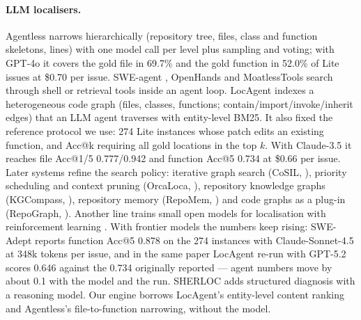 \documentclass[10pt,twocolumn]{article}
\makeatletter
\newcommand{\accat}[1]{Acc@#1}
\makeatother
\begin{document}
\paragraph{LLM localisers.}
Agentless \citep{xia2025agentless} narrows hierarchically (repository tree, files, class and
function skeletons, lines) with one model call per level plus sampling and voting; with GPT-4o it
covers the gold file in 69.7\% and the gold function in 52.0\% of Lite issues at \$0.70 per issue.
SWE-agent \citep{yang2024sweagent}, OpenHands \citep{wang2025openhands} and MoatlessTools
\citep{moatless} search through shell or retrieval tools inside an agent loop. LocAgent
\citep{chen2025locagent} indexes a heterogeneous code graph (files, classes, functions;
contain/import/invoke/inherit edges) that an LLM agent traverses with entity-level BM25. It also
fixed the reference protocol we use: 274 Lite instances whose patch edits an existing function, and
\accat{k} requiring all gold locations in the top $k$. With Claude-3.5 it reaches file \accat{1}/5
0.777/0.942 and function \accat{5} 0.734 at \$0.66 per issue. Later systems refine the search
policy: iterative graph search (CoSIL, \citealp{jiang2025cosil}), priority scheduling and context
pruning (OrcaLoca, \citealp{yu2025orcaloca}), repository knowledge graphs (KGCompass,
\citealp{yang2025kgcompass}), repository memory (RepoMem, \citealp{wang2025repomem}) and code graphs as
a plug-in (RepoGraph, \citealp{ouyang2025repograph}). Another line trains small open models for
localisation with reinforcement learning \citep{ma2026tooltrain,sutawika2026codescout,xu2026fusesearch}.
With frontier models the numbers keep rising: SWE-Adept \citep{he2026sweadept} reports function
\accat{5} 0.878 on the 274 instances with Claude-Sonnet-4.5 at 348k tokens per issue, and in the same
paper LocAgent re-run with GPT-5.2 scores 0.646 against the 0.734 originally reported --- agent
numbers move by about 0.1 with the model and the run. SHERLOC \citep{tamoyan2026sherloc} adds
structured diagnosis with a reasoning model. Our engine borrows LocAgent's entity-level content
ranking and Agentless's file-to-function narrowing, without the model.
\end{document}

